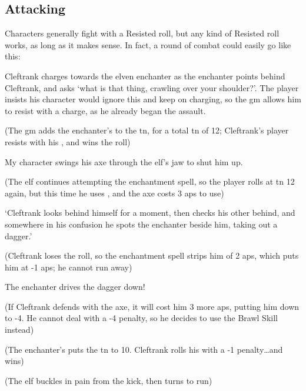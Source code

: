 \begin{multicols}{2}

\subsection{Attacking}
\label{attack}

Characters generally fight with a Resisted  roll, but any kind of Resisted roll works, as long as it makes sense.
In fact, a round of combat could easily go like this:

\begin{exampletext}
  Cleftrank charges towards the elven enchanter as the enchanter points behind Cleftrank, and asks `what is that thing, crawling over your shoulder?'.
  The player insists his character would ignore this and keep on charging, so the \gls{gm} allows him to resist with a charge, as he already began the assault.

  \small{(The \gls{gm} adds the enchanter's  to the \gls{tn}, for a total \gls{tn} of 12; Cleftrank's player resists with his , and wins the roll)}

  My character swings his axe through the elf's jaw to shut him up.

  \small{(The elf continues attempting the enchantment spell, so the player rolls at \gls{tn} 12 again, but this time he uses , and the axe costs 3 \glspl{ap} to use)}

  `Cleftrank looks behind himself for a moment, then checks his other behind, and somewhere in his confusion he spots the enchanter beside him, taking out a dagger.'

  \small{(Cleftrank loses the roll, so the enchantment spell strips him of 2 \glspl{ap}, which puts him at -1 \glspl{ap}; he cannot run away)}

  The enchanter drives the dagger down!

  \small{(If Cleftrank defends with the axe, it will cost him 3 more \glspl{ap}, putting him down to -4.
  He cannot deal with a -4 penalty, so he decides to use the Brawl Skill instead)}

  (The enchanter's  puts the \gls{tn} to 10.
  Cleftrank rolls his  with a -1 penalty\ldots and wins)

  \small{(The elf buckles in pain from the kick, then turns to run)}

\end{exampletext}


\end{multicols}
